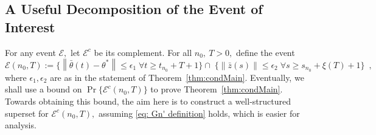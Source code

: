 \documentclass[usenames,dvipsnames,final,12pt]{colt2018} %
\newcommand{\et}{\epsilon_1}
\newcommand{\thS}{\theta^*}
\newcommand{\bart}{\bar{\theta}}
\newcommand{\ez}{\epsilon_2}
\newcommand{\barz}{\bar{z}}
\newcommand{\tI}[1]{t_{#1}}
\newcommand{\sI}[1]{s_{#1}}
\newcommand{\cE}{\mathcal{E}}
\newcommand{\norm}[1]{\left\lVert#1\right\rVert}
\newcommand{\gal}[1]{#1}
\newcommand{\gugan}[1]{#1}
\begin{document}
%
%
%
%


\subsection{A \gal{Useful} Decomposition of the Event of Interest}
\label{subsec:SuperSet}

\gugan{
	For any event $\cE,$ let $\cE^c$ be its complement.  For all $n_0,~T > 0,$ define the event
	\begin{equation}
	\cE(n_0, T) := \{\norm{\bart(t) - \thS} \leq \et \; \forall t \geq \tI{n_0} + T + 1\} \cap \; \{\norm{\barz(s)} \leq \ez \; \forall s \geq \sI{n_0} + \xi(T) + 1\}\enspace, \label{eq: definition E(t)}
	\end{equation}
	where $\et, \ez$ are as in the statement of Theorem~\ref{thm:condMain}. Eventually, we shall use a bound on $\Pr\{\cE^c(n_0, T)\}$ to prove Theorem~\ref{thm:condMain}. Towards obtaining this bound, the aim here is to construct a well-structured superset for $\cE^c(n_0, T),$ assuming \eqref{eq: Gn' definition} holds, which is easier for analysis.
}
\end{document}
